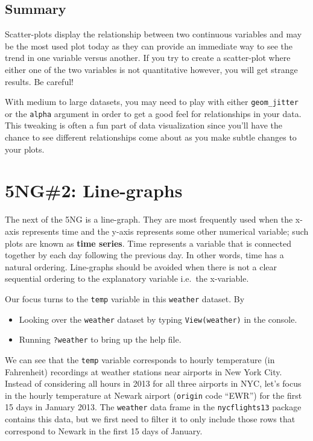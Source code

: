 \documentclass[]{tufte-book}
\providecommand{\tightlist}{%
  \setlength{\itemsep}{0pt}\setlength{\parskip}{0pt}}
\begin{document}
\subsection{Summary}\label{summary}

Scatter-plots display the relationship between two continuous variables
and may be the most used plot today as they can provide an immediate way
to see the trend in one variable versus another. If you try to create a
scatter-plot where either one of the two variables is not quantitative
however, you will get strange results. Be careful!

With medium to large datasets, you may need to play with either
\texttt{geom\_jitter} or the \texttt{alpha} argument in order to get a
good feel for relationships in your data. This tweaking is often a fun
part of data visualization since you'll have the chance to see different
relationships come about as you make subtle changes to your plots.

\section{5NG\#2: Line-graphs}\label{linegraphs}

The next of the 5NG is a line-graph. They are most frequently used when
the x-axis represents time and the y-axis represents some other
numerical variable; such plots are known as \textbf{time series}. Time
represents a variable that is connected together by each day following
the previous day. In other words, time has a natural ordering.
Line-graphs should be avoided when there is not a clear sequential
ordering to the explanatory variable i.e.~the x-variable.

Our focus turns to the \texttt{temp} variable in this \texttt{weather}
dataset. By

\begin{itemize}
\tightlist
\item
  Looking over the \texttt{weather} dataset by typing
  \texttt{View(weather)} in the console.
\item
  Running \texttt{?weather} to bring up the help file.
\end{itemize}

We can see that the \texttt{temp} variable corresponds to hourly
temperature (in Fahrenheit) recordings at weather stations near airports
in New York City. Instead of considering all hours in 2013 for all three
airports in NYC, let's focus in the hourly temperature at Newark airport
(\texttt{origin} code ``EWR'') for the first 15 days in January 2013.
The \texttt{weather} data frame in the \texttt{nycflights13} package
contains this data, but we first need to filter it to only include those
rows that correspond to Newark in the first 15 days of January.
\end{document}

